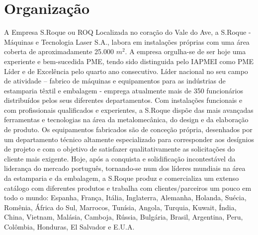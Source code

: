 \section{Organização}
\qquad A Empresa S.Roque ou ROQ
\emptyline
Localizada no coração do Vale do Ave, a S.Roque - Máquinas e Tecnologia Laser S.A., labora em instalações próprias com uma área coberta de aproximadamente 25.000 $m^{2}$. A empresa orgulha-se de ser hoje uma experiente e bem-sucedida PME, tendo sido distinguida pelo IAPMEI como PME Líder e de Excelência pelo quarto ano consecutivo.
\emptyline
Líder nacional no seu campo de atividade – fabrico de máquinas e equipamentos para as indústrias de estamparia têxtil e embalagem - emprega atualmente mais de 350 funcionários distribuídos pelos seus diferentes departamentos.
\emptyline
Com instalações funcionais e com profissionais qualificados e experientes, a S.Roque dispõe das mais avançadas ferramentas e tecnologias na área da metalomecânica, do design e da elaboração de produto. Os equipamentos fabricados são de conceção própria, desenhados por um departamento técnico altamente especializado para corresponder aos desígnios de projeto e com o objetivo de satisfazer qualitativamente as solicitações do cliente mais exigente.
\emptyline
Hoje, após a conquista e solidificação incontestável da liderança do mercado português, tornando-se num dos líderes mundiais na área da estamparia e da embalagem, a S.Roque produz e comercializa um extenso catálogo com diferentes produtos e trabalha com clientes/parceiros um pouco em todo o mundo: Espanha, França, Itália, Inglaterra, Alemanha, Holanda, Suécia, Romênia, África do Sul, Marrocos, Tunísia, Angola, Turquia, Kuwait, Índia, China, Vietnam, Malásia, Camboja, Rússia, Bulgária, Brasil, Argentina, Peru, Colômbia, Honduras, El Salvador e E.U.A.
